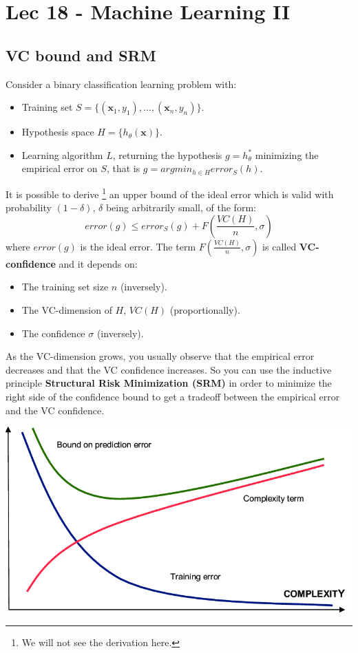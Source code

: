 \chapter{Lec 18 - Machine Learning II}

\section{VC bound and SRM}
Consider a binary classification learning problem with:
\begin{itemize}
    \item Training set $S = \{(\textbf{x}_{1},y_{1}),...,(\textbf{x}_{n},y_{n})\}$.
    \item Hypothesis space $H = \{h_{\theta}(\textbf{x})\}$.
    \item Learning algorithm $L$, returning the hypothesis $g = h_{\theta}^{*}$ minimizing the empirical error on $S$, that is $g = argmin_{h \in H}error_{S}(h)$.
\end{itemize}
It is possible to derive \footnote{We will not see the derivation here.} an upper bound of the ideal error which is valid with probability $(1-\delta)$, $\delta$ being arbitrarily small, of the form:
\[error(g) \leq error_{S}(g) + F(\frac{VC(H)}{n},\sigma)\]
where $error(g)$ is the ideal error. The term $F(\frac{VC(H)}{n},\sigma)$ is called \textbf{VC-confidence} and it depends on:
\begin{itemize}
    \item The training set size $n$ (inversely).
    \item The VC-dimension of $H$, $VC(H)$ (proportionally).
    \item The confidence $\sigma$ (inversely).
\end{itemize}
As the VC-dimension grows, you usually observe that the empirical error decreases and that the VC confidence increases. So you can use the inductive principle \textbf{Structural Risk Minimization (SRM)} in order to minimize the right side of the confidence bound to get a tradeoff between the empirical error and the VC confidence.
\begin{center}
    \includegraphics[scale=0.3]{images/Structural-risk-minimization-principle-Vapnik-1998.png}
\end{center}

